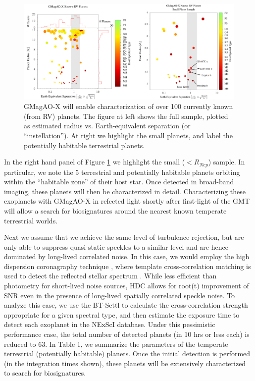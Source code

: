 \documentclass[12pt,preprint]{aastex}
\begin{document}
\begin{figure}[h!]
\centering
\includegraphics[width=6in]{figures/fig3.png}
\caption{GMagAO-X will enable characterization of over 100 currently known (from RV) planets.  The figure at left shows the full sample, plotted as estimated radius vs. Earth-equivalent separation (or “instellation”).  At right we highlight the small planets, and label the potentially habitable terrestrial planets. \label{fig:planets}}
\end{figure}

In the right hand panel of Figure \ref{fig:planets} we highlight the small ($< R_{Nep}$) sample.  In particular, we note the 5 terrestrial and potentially habitable planets orbiting within the “habitable zone” of their host star.  Once detected in broad-band imaging, these planets will then be characterized in detail.  Characterizing these exoplanets with GMagAO-X in refected light shortly after first-light of the GMT will allow a search for biosignatures around the nearest known temperate terrestrial worlds.
   
Next we assume that we achieve the same level of turbulence rejection, but are only able to suppress quasi-static speckles to a similar level and are hence dominated by long-lived correlated noise.  In this case, we would employ the high dispersion coronagraphy technique \citep[HDC,][]{2017ApJ...838...92M}, where template cross-correlation matching is used to detect the reflected stellar spectrum \citep{2017A&A...599A..16L}.  While less efficient than photometry for short-lived noise sources, HDC allows for root(t) improvement of SNR even in the presence of long-lived spatially correlated speckle noise.  To analyze this case, we use the BT-Settl \citep{2014IAUS..299..271A} to calculate the cross-correlation strength appropriate for a given spectral type, and then estimate the exposure time to detect each exoplanet in the NExScI database. Under this pessimistic performance case, the total number of detected planets (in 10 hrs or less each) is reduced to 63.
In Table 1, we summarize the parameters of the temperate terrestrial (potentially habitable) planets.  Once the initial detection is performed (in the integration times shown), these planets will be extensively characterized to search for biosignatures.
\end{document}
